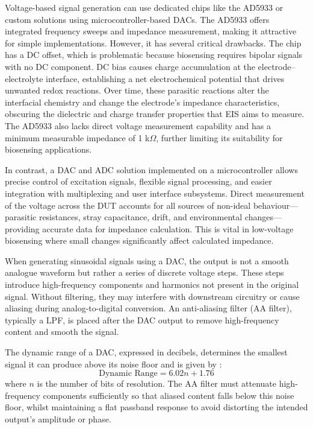 Voltage-based signal generation can use dedicated chips like the AD5933 or custom solutions using microcontroller-based \acp{DAC}. The AD5933 offers integrated frequency sweeps and impedance measurement, making it attractive for simple implementations. However, it has several critical drawbacks. The chip has a DC offset, which is problematic because biosensing requires bipolar signals with no DC component. DC bias causes charge accumulation at the electrode–electrolyte interface, establishing a net electrochemical potential that drives unwanted redox reactions. Over time, these parasitic reactions alter the interfacial chemistry and change the electrode's impedance characteristics, obscuring the dielectric and charge transfer properties that \ac{EIS} aims to measure. The AD5933 also lacks direct voltage measurement capability and has a minimum measurable impedance of 1 k$\Omega$, further limiting its suitability for biosensing applications.

In contrast, a \ac{DAC} and \ac{ADC} solution implemented on a microcontroller allows precise control of excitation signals, flexible signal processing, and easier integration with multiplexing and user interface subsystems. Direct measurement of the voltage across the \ac{DUT} accounts for all sources of non-ideal behaviour—parasitic resistances, stray capacitance, drift, and environmental changes—providing accurate data for impedance calculation. This is vital in low-voltage biosensing where small changes significantly affect calculated impedance.

When generating sinusoidal signals using a \ac{DAC}, the output is not a smooth analogue waveform but rather a series of discrete voltage steps. These steps introduce high-frequency components and harmonics not present in the original signal. Without filtering, they may interfere with downstream circuitry or cause aliasing during analog-to-digital conversion. An anti-aliasing filter (AA filter), typically a \ac{LPF}, is placed after the \ac{DAC} output to remove high-frequency content and smooth the signal.

The dynamic range of a \ac{DAC}, expressed in decibels, determines the smallest signal it can produce above its noise floor and is given by \cite{gaddyDYNAMICPERFORMANCETESTING}:
\begin{equation}
    \text{Dynamic Range} = 6.02n + 1.76 
    \label{eq:dac_range_lit}
\end{equation}
where $n$ is the number of bits of resolution. The AA filter must attenuate high-frequency components sufficiently so that aliased content falls below this noise floor, whilst maintaining a flat passband response to avoid distorting the intended output's amplitude or phase.

